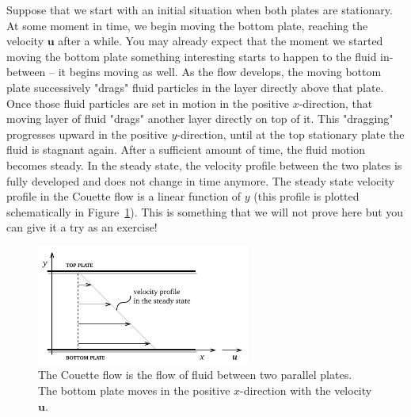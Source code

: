 \documentclass[10pt,twocolumn]{article}
\begin{document}
Suppose that we start with an initial situation when both plates are stationary. At some moment in time, we begin moving the bottom plate, reaching the velocity $\mathbf{u}$ after a while. You may already expect that the moment we started moving the bottom plate something interesting starts to happen to the fluid in-between -- it begins moving as well. As the flow develops, the moving bottom plate successively "drags" fluid particles in the layer directly above that plate. Once those fluid particles are set in motion in the positive $x$-direction, that moving layer of fluid "drags" another layer directly on top of it. This "dragging" progresses upward in the positive $y$-direction, until at the top stationary plate the fluid is stagnant again. After a sufficient amount of time, the fluid motion becomes steady. In the steady state, the velocity profile between the two plates is fully developed and does not change in time anymore. The steady state velocity profile in the Couette flow is a linear function of $y$ (this profile is plotted schematically in Figure~\ref{fig:couette-flow}). This is something that we will not prove here but you can give it a try as an exercise!
\begin{figure}[H]
\centering\includegraphics[width=7cm]{couette-flow.pdf}
\caption{The Couette flow is the flow of fluid between two parallel plates. The bottom plate moves in the positive $x$-direction with the velocity $\mathbf{u}$.}
\label{fig:couette-flow}
\end{figure}
\end{document}
